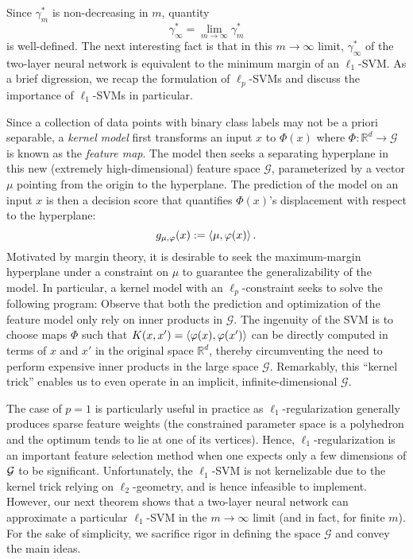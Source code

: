 
Since $\gamma_m^*$ is non-decreasing in $m$, quantity 
\begin{equation}
\gamma_\infty ^* = \lim_{m\to \infty } \gamma_m^*
\end{equation}
is well-defined. The next interesting fact is that in this $m \to \infty$ limit, $\gamma_{\infty}^*$ of the two-layer neural network is equivalent to the minimum margin of an $\ell_1$-SVM. As a brief digression, we recap the formulation of $\ell_p$-SVMs and discuss the importance of $\ell_1$-SVMs in particular.

Since a collection of data points with binary class labels may not be a priori separable, a \textit{kernel model} first transforms an input $x$ to $\Phi(x)$ where $\Phi: \mathbb{R}^d \to \mathcal{G}$ is known as the \textit{feature map}. The model then seeks a separating hyperplane in this new (extremely high-dimensional) feature space $\mathcal{G}$, parameterized by a vector $\mu$ pointing from the origin to the hyperplane. The prediction of the model on an input $x$ is then a decision score that quantifies $\Phi(x)$'s displacement with respect to the hyperplane:
\begin{equation}
g_{\mu, \varphi}(x) := \left\langle \mu, \varphi(x) \right\rangle.
\end{equation}
Motivated by margin theory, it is desirable to seek the maximum-margin hyperplane under a constraint on $\mu$ to guarantee the generalizability of the model. In particular, a kernel model with an $\ell_p$-constraint seeks to solve the following program:
Observe that both the prediction and optimization of the feature model only rely on inner products in $\mathcal{G}$. The ingenuity of the SVM is to choose maps $\Phi$ such that $K(x, x') = \left\langle \varphi(x), \varphi(x') \right\rangle$ can be directly computed in terms of $x$ and $x'$ in the original space $\mathbb{R}^d$, thereby circumventing the need to perform expensive inner products in the large space $\mathcal{G}$. Remarkably, this ``kernel trick'' enables us to even operate in an implicit, infinite-dimensional $\mathcal{G}$. 

The case of $p=1$ is particularly useful in practice as $\ell_1$-regularization generally produces sparse feature weights (the constrained parameter space is a polyhedron and the optimum tends to lie at one of its vertices). Hence, $\ell_1$-regularization is an important feature selection method when one expects only a few dimensions of $\mathcal G$ to be significant. Unfortunately, the $\ell_1$-SVM is not kernelizable due to the kernel trick relying on $\ell_2$-geometry, and is hence infeasible to implement. However, our next theorem shows that a two-layer neural network can approximate a particular $\ell_1$-SVM in the $m \to \infty$ limit (and in fact, for finite $m$). For the sake of simplicity, we sacrifice rigor in defining the space $\mathcal{G}$ and convey the main ideas.

